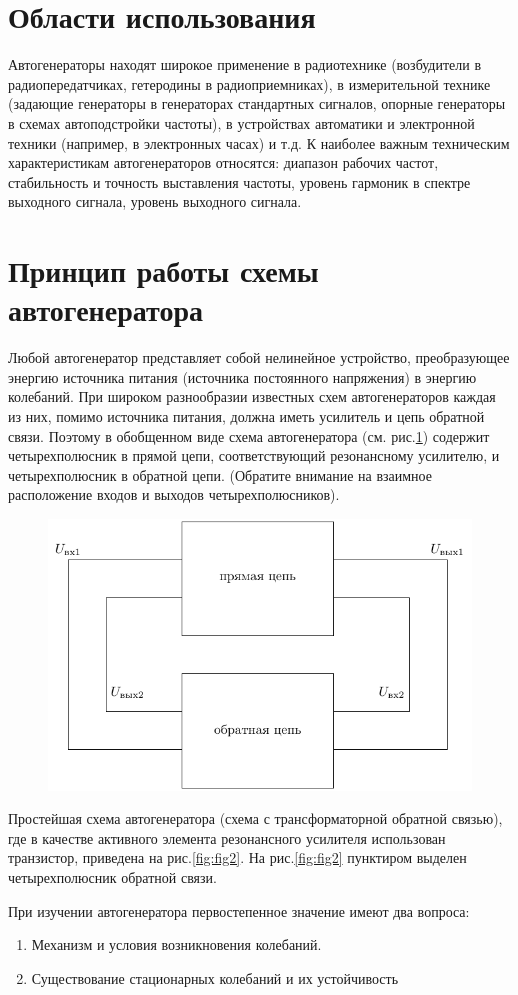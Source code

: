 \section{Области использования}
Автогенераторы находят широкое применение в радиотехнике (возбудители в радиопередатчиках, гетеродины в радиоприемниках), в измерительной технике (задающие генераторы в генераторах стандартных сигналов, опорные генераторы в схемах автоподстройки частоты), в устройствах автоматики и электронной техники (например, в электронных часах) и т.д.
К наиболее важным техническим характеристикам автогенераторов относятся: диапазон рабочих частот, стабильность и точность выставления частоты, уровень гармоник в спектре выходного сигнала, уровень выходного сигнала.

\section{Принцип работы схемы автогенератора}
Любой автогенератор представляет собой нелинейное устройство, преобразующее энергию источника питания (источника постоянного напряжения) в энергию колебаний. При широком разнообразии известных схем автогенераторов каждая из них, помимо источника питания, должна иметь усилитель и цепь обратной связи. Поэтому в обобщенном виде схема автогенератора (см. рис.\ref{fig:fig1}) содержит четырехполюсник в прямой цепи, соответствующий резонансному усилителю, и четырехполюсник в обратной цепи. (Обратите внимание на взаимное расположение входов и выходов четырехполюсников).
\begin{figure}[h]
	\centering
	\includegraphics[width=0.5\linewidth]{circuit/one.pdf}
	\caption{}
	\label{fig:fig1}
\end{figure}
Простейшая схема автогенератора (схема с трансформаторной обратной связью), где в качестве активного элемента резонансного усилителя использован транзистор, приведена на рис.\ref{fig:fig2}. На рис.\ref{fig:fig2} пунктиром выделен четырехполюсник обратной связи.

При изучении автогенератора первостепенное значение имеют два вопроса:
\begin{enumerate}
\item Механизм и условия возникновения колебаний.
\item Существование стационарных колебаний и их устойчивость
\end{enumerate}

